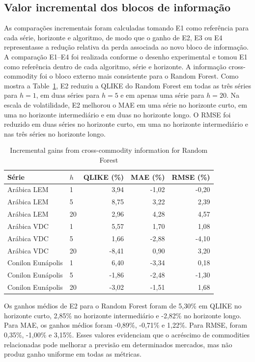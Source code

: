 \documentclass[a4paper,fleqn]{cas-sc}
\begin{document}
\subsection{Valor incremental dos blocos de informação}
\label{subsec:results_incremental}

As comparações incrementais foram calculadas tomando E1 como referência para cada série, horizonte e algoritmo, de modo que o ganho de E2, E3 ou E4 representasse a redução relativa da perda associada ao novo bloco de informação. A comparação E1--E4 foi realizada conforme o desenho experimental e tomou E1 como referência dentro de cada algoritmo, série e horizonte. A informação cross-commodity foi o bloco externo mais consistente para o Random Forest. Como mostra a Table~\ref{tab:rf_incremental}, E2 reduziu a QLIKE do Random Forest em todas as três séries para \(h=1\), em duas séries para \(h=5\) e em apenas uma série para \(h=20\). Na escala de volatilidade, E2 melhorou o MAE em uma série no horizonte curto, em uma no horizonte intermediário e em duas no horizonte longo. O RMSE foi reduzido em duas séries no horizonte curto, em uma no horizonte intermediário e nas três séries no horizonte longo.

\begin{table}[t]
\centering
\caption{Incremental gains from cross-commodity information for Random Forest}
\label{tab:rf_incremental}
\scriptsize
\setlength{\tabcolsep}{2pt}
\begin{tabular}{@{}p{2.15cm}p{0.55cm}rrr@{}}
\hline
Série & \(h\) & QLIKE (\%) & MAE (\%) & RMSE (\%) \\
\hline
Arábica LEM & 1 & 3,94 & -1,02 & -0,20 \\
Arábica LEM & 5 & 8,75 & 3,22 & 2,39 \\
Arábica LEM & 20 & 2,96 & 4,28 & 4,57 \\
Arábica VDC & 1 & 5,57 & 1,70 & 1,08 \\
Arábica VDC & 5 & 1,66 & -2,88 & -4,10 \\
Arábica VDC & 20 & -8,41 & 0,90 & 3,20 \\
Conilon Eunápolis & 1 & 6,40 & -3,34 & 0,18 \\
Conilon Eunápolis & 5 & -1,86 & -2,48 & -1,30 \\
Conilon Eunápolis & 20 & -3,02 & -1,51 & 1,68 \\
\hline
\end{tabular}
\end{table}

Os ganhos médios de E2 para o Random Forest foram de 5,30\% em QLIKE no horizonte curto, 2,85\% no horizonte intermediário e -2,82\% no horizonte longo. Para MAE, os ganhos médios foram -0,89\%, -0,71\% e 1,22\%. Para RMSE, foram 0,35\%, -1,00\% e 3,15\%. Esses valores evidenciam que o acréscimo de commodities relacionadas pode melhorar a previsão em determinados mercados, mas não produz ganho uniforme em todas as métricas.
\end{document}
